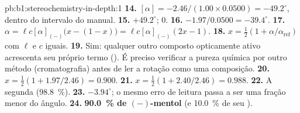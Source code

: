\begin{solution}{pb:b1:stereochemistry-in-depth:1}
\textbf{14.} $[\alpha] = -2.46/(1.00 \times 0.0500) = -49.2^\circ$, dentro
do intervalo do manual.
\textbf{15.} $+49.2^\circ$; $0$.
\textbf{16.} $-1.97/0.0500 = -39.4^\circ$.
\textbf{17.} $\alpha = \ell c[\alpha]_{(-)}\bigl(x - (1 - x)\bigr) =
\ell c[\alpha]_{(-)}(2x - 1)$.
\textbf{18.} $x = \frac12(1 + \alpha/\alpha_{\text{ref}})$ com $\ell$ e $c$ iguais.
\textbf{19.} Sim: qualquer outro composto opticamente ativo acrescenta
seu próprio termo (). É preciso verificar a pureza química por
outro método (cromatografia) antes de ler a rotação como uma composição.
\textbf{20.} $x = \frac12(1 + 1.97/2.46) = 0.900$.
\textbf{21.} $x = \frac12(1 + 2.40/2.46) = 0.988$.
\textbf{22.} A segunda (\qty{98.8}{\percent}).
\textbf{23.} $-3.94^\circ$; o mesmo erro de leitura passa a ser uma
fração menor do ângulo.
\textbf{24.} \textbf{\qty{90.0}{\percent} de $(-)$-mentol} (e
\qty{10.0}{\percent} de seu ).
\end{solution}
